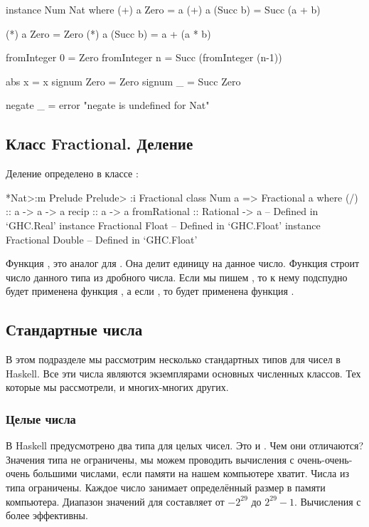 \begin{code}
instance Num Nat where
    (+) a Zero     = a
    (+) a (Succ b) = Succ (a + b)

    (*) a Zero     = Zero
    (*) a (Succ b) = a + (a * b)   

    fromInteger 0 = Zero
    fromInteger n = Succ (fromInteger (n-1))

    abs    x    = x 
    signum Zero = Zero
    signum _    = Succ Zero

    negate _ = error "negate is undefined for Nat"
\end{code}


\subsection{Класс Fractional. Деление}

Деление определено в классе :

\begin{code}
*Nat>:m Prelude
Prelude> :i Fractional
class Num a => Fractional a where
  (/) :: a -> a -> a
  recip :: a -> a
  fromRational :: Rational -> a
  	-- Defined in `GHC.Real'
instance Fractional Float -- Defined in `GHC.Float'
instance Fractional Double -- Defined in `GHC.Float'
\end{code}

Функция , это аналог  для .
Она делит единицу на данное число. Функция 
строит число данного типа из дробного числа. 
Если мы пишем , то к нему подспудно будет применена функция
, а если , то будет применена функция
.


\subsection{Стандартные числа}

В этом подразделе мы рассмотрим несколько стандартных
типов для чисел в Haskell. Все эти числа являются
экземплярами основных численных классов. Тех которые
мы рассмотрели, и многих-многих других.

\subsubsection{Целые числа}

В Haskell предусмотрено два типа для целых чисел. 
Это   и . 
Чем они отличаются? 
Значения типа  не ограничены, мы можем проводить
вычисления с очень-очень-очень большими числами, если памяти на 
нашем компьютере хватит. Числа из типа   ограничены.
Каждое число занимает определённый размер в памяти компьютера. 
Диапазон значений для  составляет от $-2^{29}$ до $2^{29}-1$.
Вычисления с  более эффективны.  

